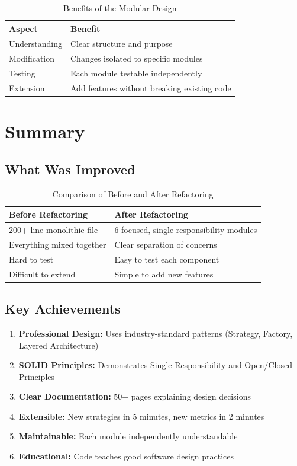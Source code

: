 \documentclass[11pt,a4paper]{article}
\begin{document}
\begin{table}[H]
\centering
\begin{tabular}{@{}ll@{}}
\toprule
\textbf{Aspect} & \textbf{Benefit} \\ \midrule
Understanding & Clear structure and purpose \\
Modification & Changes isolated to specific modules \\
Testing & Each module testable independently \\
Extension & Add features without breaking existing code \\ \bottomrule
\end{tabular}
\caption{Benefits of the Modular Design}
\end{table}

\newpage
\section{Summary}

\subsection{What Was Improved}

\begin{table}[H]
\centering
\begin{tabular}{@{}p{}p{}@{}}
\toprule
\textbf{Before Refactoring} & \textbf{After Refactoring} \\ \midrule
200+ line monolithic file & 6 focused, single-responsibility modules \\
Everything mixed together & Clear separation of concerns \\
Hard to test & Easy to test each component \\
Difficult to extend & Simple to add new features \\ \bottomrule
\end{tabular}
\caption{Comparison of Before and After Refactoring}
\end{table}

\subsection{Key Achievements}

\begin{enumerate}
    \item \textbf{Professional Design:} Uses industry-standard patterns (Strategy, Factory, Layered Architecture)
    \item \textbf{SOLID Principles:} Demonstrates Single Responsibility and Open/Closed Principles
    \item \textbf{Clear Documentation:} 50+ pages explaining design decisions
    \item \textbf{Extensible:} New strategies in 5 minutes, new metrics in 2 minutes
    \item \textbf{Maintainable:} Each module independently understandable
    \item \textbf{Educational:} Code teaches good software design practices
\end{enumerate}
\end{document}
